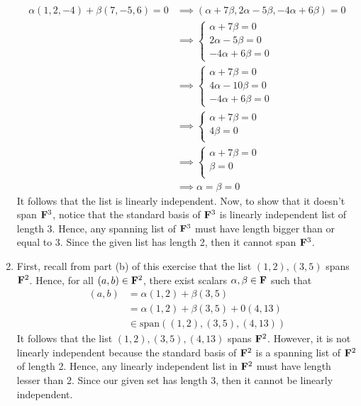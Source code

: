 \begin{solution}
\begin{enumerate}[label=(\alph*)]
        \begin{align*}
            \alpha(1,2,-4) + \beta(7, -5, 6) = 0 &\implies (\alpha + 7\beta, 2\alpha - 5 \beta, -4\alpha + 6\beta) = 0 \\
            &\implies \begin{cases}
                \alpha + 7\beta = 0 \\ 2\alpha - 5 \beta = 0 \\ -4\alpha + 6\beta = 0
            \end{cases} \\
            &\implies \begin{cases}
                \alpha + 7\beta = 0 \\ 4\alpha - 10 \beta = 0 \\ -4\alpha + 6\beta = 0
            \end{cases} \\
            &\implies \begin{cases}
                \alpha + 7\beta = 0 \\ 4 \beta = 0 \\ 
            \end{cases} \\
            &\implies \begin{cases}
                \alpha + 7\beta = 0 \\ \beta = 0 \\ 
            \end{cases} \\
            &\implies \alpha = \beta = 0
        \end{align*}
        It follows that the list is linearly independent. Now, to show that it doesn't span $\mathbf{F}^3$, notice that the standard basis of $\mathbf{F}^3$ is linearly independent list of length 3. Hence, any spanning list of $\mathbf{F}^3$ must have length bigger than or equal to 3. Since the given list has length 2, then it cannot span $\mathbf{F}^3$.
        \item First, recall from part (b) of this exercise that the list $(1,2), (3,5)$ spans $\mathbf{F}^2$. Hence, for all $(a,b) \in \mathbf{F}^2$, there exist scalars $\alpha, \beta \in \mathbf{F}$ such that
        \begin{align*}
            (a,b) &= \alpha (1,2) + \beta(3,5) \\
            &= \alpha (1,2) + \beta(3,5) + 0 (4,13)\\
            &\in \text{span}((1,2), (3,5), (4,13))
        \end{align*}
        It follows that the list $(1,2), (3,5), (4,13)$ spans $\mathbf{F}^2$. However, it is not linearly independent because the standard basis of $\mathbf{F}^2$ is a spanning list of $\mathbf{F}^2$ of length 2. Hence, any linearly independent list in $\mathbf{F}^2$ must have length lesser than 2. Since our given set has length 3, then it cannot be linearly independent.  

\end{enumerate}
\end{solution}
